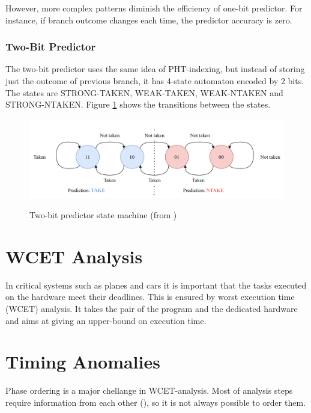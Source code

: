 However, more complex patterns diminish the efficiency of one-bit predictor. For instance, if branch outcome changes each time, the predictor accuracy is zero.

\subsubsection{Two-Bit Predictor}

The two-bit predictor uses the same idea of PHT-indexing, but instead of storing just the outcome of previous branch, it has 4-state automaton encoded by 2 bits. The states are STRONG-TAKEN, WEAK-TAKEN, WEAK-NTAKEN and STRONG-NTAKEN. Figure \ref{fig:two-bit-counter} shows the transitions between the states.

\begin{figure}
    \includegraphics[width=\textwidth]{figures/two-bit-counter.png}
    \label{fig:two-bit-counter}
    \caption{Two-bit predictor state machine (from \cite{mahling_reverse_2023})}
\end{figure}




\section{WCET Analysis}

In critical systems such as planes and cars it is important that the tasks executed on the hardware meet their deadlines. This is ensured by worst execution time (WCET) analysis. It takes the pair of the program and the dedicated hardware and aims at giving an upper-bound on execution time. 


\section{Timing Anomalies}

Phase ordering is a major chellange in WCET-analysis. Most of analysis steps require information from each other (), so it is not always possible to order them. 

